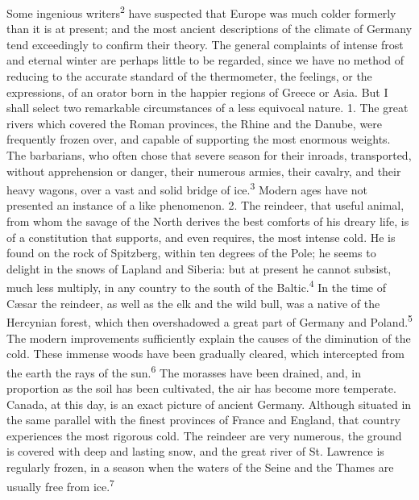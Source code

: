 Some ingenious writers\textsuperscript{2} have suspected that Europe was much
colder formerly than it is at present; and the most ancient
descriptions of the climate of Germany tend exceedingly to
confirm their theory. The general complaints of intense frost and
eternal winter are perhaps little to be regarded, since we have
no method of reducing to the accurate standard of the
thermometer, the feelings, or the expressions, of an orator born
in the happier regions of Greece or Asia. But I shall select two
remarkable circumstances of a less equivocal nature. 1. The great
rivers which covered the Roman provinces, the Rhine and the
Danube, were frequently frozen over, and capable of supporting
the most enormous weights. The barbarians, who often chose that
severe season for their inroads, transported, without
apprehension or danger, their numerous armies, their cavalry, and
their heavy wagons, over a vast and solid bridge of ice.\textsuperscript{3} Modern
ages have not presented an instance of a like phenomenon. 2. The
reindeer, that useful animal, from whom the savage of the North
derives the best comforts of his dreary life, is of a
constitution that supports, and even requires, the most intense
cold. He is found on the rock of Spitzberg, within ten degrees of
the Pole; he seems to delight in the snows of Lapland and
Siberia: but at present he cannot subsist, much less multiply, in
any country to the south of the Baltic.\textsuperscript{4} In the time of Cæsar
the reindeer, as well as the elk and the wild bull, was a native
of the Hercynian forest, which then overshadowed a great part of
Germany and Poland.\textsuperscript{5} The modern improvements sufficiently
explain the causes of the diminution of the cold. These immense
woods have been gradually cleared, which intercepted from the
earth the rays of the sun.\textsuperscript{6} The morasses have been drained, and,
in proportion as the soil has been cultivated, the air has become
more temperate. Canada, at this day, is an exact picture of
ancient Germany. Although situated in the same parallel with the
finest provinces of France and England, that country experiences
the most rigorous cold. The reindeer are very numerous, the
ground is covered with deep and lasting snow, and the great river
of St. Lawrence is regularly frozen, in a season when the waters
of the Seine and the Thames are usually free from ice.\textsuperscript{7}


